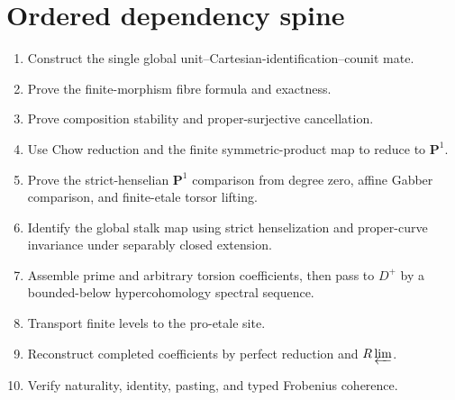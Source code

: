 \section{Ordered dependency spine}
\begin{enumerate}[label=\textbf{S\arabic*.},leftmargin=3em]
\item Construct the single global unit--Cartesian-identification--counit mate.
\item Prove the finite-morphism fibre formula and exactness.
\item Prove composition stability and proper-surjective cancellation.
\item Use Chow reduction and the finite symmetric-product map to reduce to
      $\mathbf P^1$.
\item Prove the strict-henselian $\mathbf P^1$ comparison from degree zero,
      affine Gabber comparison, and finite-etale torsor lifting.
\item Identify the global stalk map using strict henselization and proper-curve
      invariance under separably closed extension.
\item Assemble prime and arbitrary torsion coefficients, then pass to $D^+$ by
      a bounded-below hypercohomology spectral sequence.
\item Transport finite levels to the pro-etale site.
\item Reconstruct completed coefficients by perfect reduction and
      $R\varprojlim$.
\item Verify naturality, identity, pasting, and typed Frobenius coherence.
\end{enumerate}


